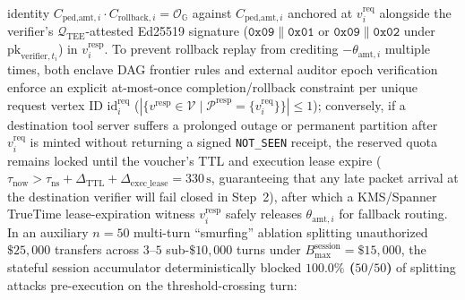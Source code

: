 \documentclass[conference,10pt]{IEEEtran}
\begin{document}
identity $C_{\text{ped,amt}, i} \cdot C_{\text{rollback}, i} = \mathcal{O}_{\mathbb{G}}$ against $C_{\text{ped,amt}, i}$ anchored at $v_i^{\text{req}}$ alongside the verifier's $\mathcal{Q}_{\text{TEE}}$-attested Ed25519 signature ($\mathtt{0x09} \parallel \mathtt{0x01}$ or $\mathtt{0x09} \parallel \mathtt{0x02}$ under $\text{pk}_{\text{verifier}, t_i}$) in $v_i^{\text{resp}}$. To prevent rollback replay from crediting $-\theta_{\text{amt}, i}$ multiple times, both enclave DAG frontier rules and external auditor epoch verification enforce an explicit at-most-once completion/rollback constraint per unique request vertex ID $\text{id}_i^{\text{req}}$ ($|\{v^{\text{resp}} \in \mathcal{V} \mid \mathcal{P}^{\text{resp}} = \{v_i^{\text{req}}\}\}| \le 1$); conversely, if a destination tool server suffers a prolonged outage or permanent partition after $v_i^{\text{req}}$ is minted without returning a signed \texttt{NOT\_SEEN} receipt, the reserved quota remains locked until the voucher's TTL and execution lease expire ($\tau_{\text{now}} > \tau_{\text{ns}} + \Delta_{\text{TTL}} + \Delta_{\text{exec\_lease}} = 330\,\text{s}$, guaranteeing that any late packet arrival at the destination verifier will fail closed in Step~2), after which a KMS/Spanner TrueTime lease-expiration witness $v_i^{\text{resp}}$ safely releases $\theta_{\text{amt}, i}$ for fallback routing. In an auxiliary $n = 50$ multi-turn ``smurfing'' ablation splitting unauthorized $\$25{,}000$ transfers across $3$--$5$ sub-$\$10{,}000$ turns under $B_{\max}^{\text{session}} = \$15{,}000$, the stateful session accumulator deterministically blocked \textbf{$100.0\%$ ($50/50$)} of splitting attacks pre-execution on the threshold-crossing turn:
\end{document}

